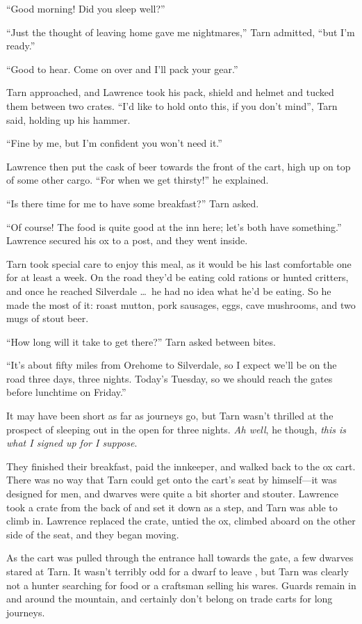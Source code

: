 ``Good morning!  Did you sleep well?''

``Just the thought of leaving home gave me nightmares,'' Tarn admitted, ``but I'm ready.''

``Good to hear.  Come on over and I'll pack your gear.''

Tarn approached, and Lawrence took his pack, shield and helmet and tucked them between two crates.  ``I'd like to hold onto this, if you don't mind'', Tarn said, holding up his hammer.

``Fine by me, but I'm confident you won't need it.''

Lawrence then put the cask of beer towards the front of the cart, high up on top of some other cargo.  ``For when we get thirsty!'' he explained.

``Is there time for me to have some breakfast?'' Tarn asked.

``Of course!  The food is quite good at the inn here; let's both have something.''  Lawrence secured his ox to a post, and they went inside.

Tarn took special care to enjoy this meal, as it would be his last comfortable one for at least a week.  On the road they'd be eating cold rations or hunted critters, and once he reached Silverdale \ldots\ he had no idea what he'd be eating.  So he made the most of it: roast mutton, pork sausages, eggs, cave mushrooms, and two mugs of stout beer.

``How long will it take to get there?'' Tarn asked between bites.

``It's about fifty miles from Orehome to Silverdale, so I expect we'll be on the road three days, three nights.  Today's Tuesday, so we should reach the gates before lunchtime on Friday.''

It may have been short as far as journeys go, but Tarn wasn't thrilled at the prospect of sleeping out in the open for three nights.  \emph{Ah well}, he though, \emph{this is what I signed up for I suppose}.

They finished their breakfast, paid the innkeeper, and walked back to the ox cart.
There was no way that Tarn could get onto the cart's seat by himself---it was designed for men, and dwarves were quite a bit shorter and stouter.  Lawrence took a crate from the back of and set it down as a step, and Tarn was able to climb in.  Lawrence replaced the crate, untied the ox, climbed aboard on the other side of the seat, and they began moving.

As the cart was pulled through the entrance hall towards the gate, a few dwarves stared at Tarn.  It wasn't terribly odd for a dwarf to leave \korbarthrond, but Tarn was clearly not a hunter searching for food or a craftsman selling his wares.  Guards remain in and around the mountain, and certainly don't belong on trade carts for long journeys.

